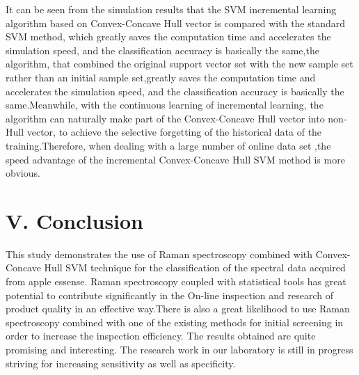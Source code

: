 \documentclass[a4paper]{article}
\begin{document}
It can be seen from the simulation results that the SVM incremental learning algorithm based on Convex-Concave Hull vector is compared with the standard SVM method, which greatly saves the computation time and accelerates the simulation speed, and the classification accuracy is basically the same,the algorithm, that combined the original support vector set with the new sample set rather than an initial sample set,greatly saves the computation time and accelerates the simulation speed, and the classification accuracy is basically the same.Meanwhile, with the continuous learning of incremental learning, the algorithm can naturally make part of the Convex-Concave Hull vector into non-Hull vector, to achieve the selective forgetting of the historical data of the training.Therefore, when dealing with a large number of online data set ,the speed advantage of the incremental Convex-Concave Hull SVM method is more obvious.

\section{V.	Conclusion}
This  study  demonstrates  the  use  of  Raman  spectroscopy  combined  with Convex-Concave Hull SVM  technique  for the  classification  of  the  spectral  data  acquired  from  apple essense. Raman  spectroscopy  coupled  with  statistical  tools  has  great  potential  to  contribute significantly in the On-line inspection and research of product quality in an effective way.There is also a great  likelihood  to  use  Raman  spectroscopy  combined  with  one  of  the  existing  methods  for initial screening in order to increase the inspection efficiency. The results obtained are quite promising and interesting. The research work in our laboratory is still in progress striving for increasing sensitivity as well as specificity.
\end{document}
